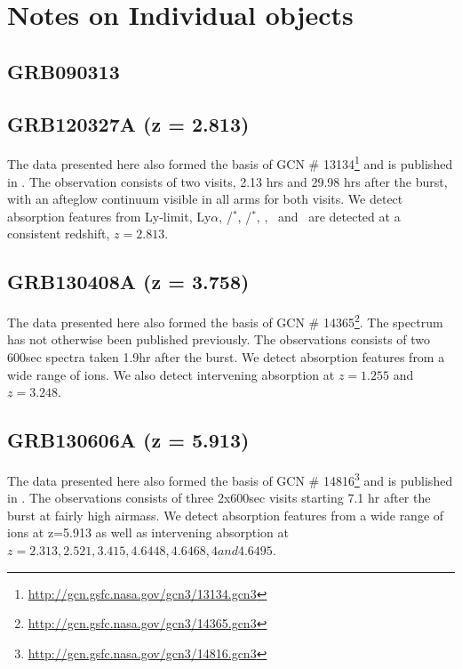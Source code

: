 \documentclass[iop, twocolappendix, numberedappendix, tighten, appendixfloats]{emulateapj}
\newcommand{\lya}{Ly$\alpha$}
\newcommand{\feii}{\ion{Fe}{2}}
\newcommand{\cii}{\ion{C}{2}}
\newcommand{\mgii}{\ion{Mg}{2}}
\newcommand{\ali}{\ion{Al}{1}}
\newcommand{\SIii}{\ion{Si}{2}}
\begin{document}
	\def\aj{AJ}
	\def\araa{ARA\&A}
	\def\apj{ApJ}
	\def\apjl{ApJL}
	\def\apjs{ApJS}
	\def\apss{Ap\&SS}
	\def\aap{A\&A}
	\def\aapr{A\&A~Rev.}
	\def\aaps{A\&AS}
	\def\mnras{MNRAS}
	\def\nat{Nature}
	\def\pasp{PASP}
	\def\aplett{Astrophys.~Lett.}
	
	
	
	
	
	\newpage
	\appendix
	\section{Notes on Individual objects}
	
	\subsection{GRB090313}
	
	\subsection{GRB120327A (z = 2.813)}
	The data presented here also formed the basis of GCN \#
	13134\footnote{\url{http://gcn.gsfc.nasa.gov/gcn3/13134.gcn3}} and is published
	in \citet{DElia2014}.
	The observation consists of two visits, 2.13 hrs and 29.98 hrs after the burst,
	with an afteglow continuum visible in all arms for both visits.
	We detect absorption features from Ly-limit, \lya, \cii/\cii$^*$, \SIii/\SIii$^*$, \ali,
	\feii ~and \mgii ~are detected at a consistent redshift, $z = 2.813$.

        \subsection{GRB130408A (z = 3.758)}
	The data presented here also formed the basis of GCN \#
	14365\footnote{\url{http://gcn.gsfc.nasa.gov/gcn3/14365.gcn3}}. The spectrum 
	has not otherwise been published previously.
	The observations consists of two 600sec spectra taken 1.9hr after the burst.
	We detect absorption features from a wide range of ions. We also detect intervening absorption at $z=1.255$
	and $z=3.248$.
	
	\subsection{GRB130606A (z = 5.913)}
	The data presented here also formed the basis of GCN \#
	14816\footnote{\url{http://gcn.gsfc.nasa.gov/gcn3/14816.gcn3}} and is published
	in \citet{Hartoog2015}.
	The observations consists of three 2x600sec visits starting 7.1 hr after the burst at fairly
	high airmass.
	We detect absorption features from a wide range of ions at z=5.913 
	as well as intervening absorption at $z=2.313, 2.521, 3.415, 4.6448, 4.6468, 4 and 4.6495$.
	
\end{document}

